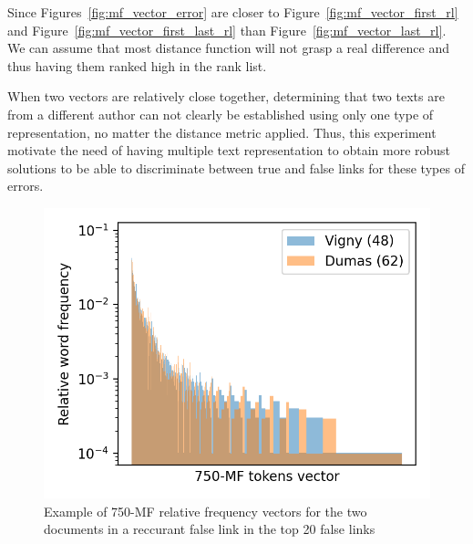 Since Figures~\ref{fig:mf_vector_error} are closer to Figure~\ref{fig:mf_vector_first_rl} and Figure~\ref{fig:mf_vector_first_last_rl} than Figure~\ref{fig:mf_vector_last_rl}.
We can assume that most distance function will not grasp a real difference and thus having them ranked high in the rank list.

When two vectors are relatively close together, determining that two texts are from a different author can not clearly be established using only one type of representation, no matter the distance metric applied.
Thus, this experiment motivate the need of having multiple text representation to obtain more robust solutions to be able to discriminate between true and false links for these types of errors.

\begin{figure}
  \centering
  \caption{Example of 750-MF relative frequency vectors for the two documents in a reccurant false link in the top 20 false links}
  \label{fig:mf_vector_error}

  \label{fig:mf_vector_error_0}
  \includegraphics[width=\linewidth]{img/mf_vector_error_0.png}

  \vspace{0.5cm}


\end{figure}
